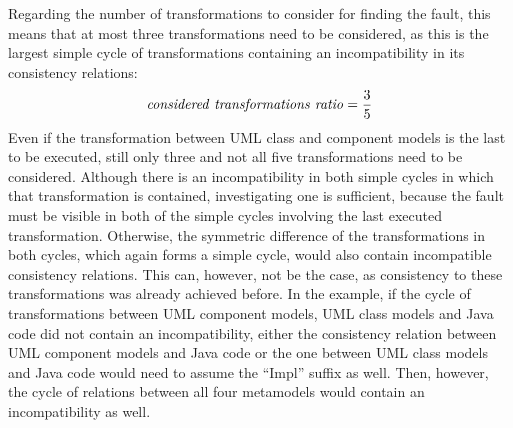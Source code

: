 Regarding the number of transformations to consider for finding the fault, this means that at most three transformations need to be considered, as this is the largest simple cycle of transformations containing an incompatibility in its consistency relations:
\begin{align*}
    \mathit{considered\ transformations\ ratio} = \frac{3}{5}
\end{align*}
Even if the transformation between \gls{UML} class and component models is the last to be executed, still only three and not all five transformations need to be considered.
Although there is an incompatibility in both simple cycles in which that transformation is contained, investigating one is sufficient, because the fault must be visible in both of the simple cycles involving the last executed transformation.
Otherwise, the symmetric difference of the transformations in both cycles, which again forms a simple cycle, would also contain incompatible consistency relations.
This can, however, not be the case, as consistency to these transformations was already achieved before.
In the example, if the cycle of transformations between \gls{UML} component models, \gls{UML} class models and Java code did not contain an incompatibility, either the consistency relation between \gls{UML} component models and Java code or the one between \gls{UML} class models and Java code would need to assume the \enquote{Impl} suffix as well. Then, however, the cycle of relations between all four metamodels would contain an incompatibility as well.


